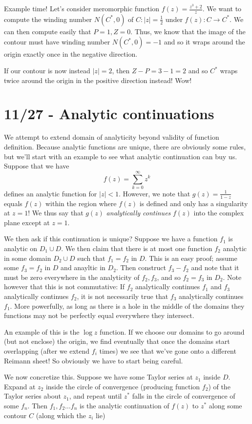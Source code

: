 \documentclass[10pt]{report}
\newcommand{\abs}[1]{\left|#1\right|}
\begin{document}
Example time! Let's consider meromorphic function $f(z) = \frac{z^3 + 2}{z}$. We want to compute the winding number $N(C^*,0)$ of $C:\abs{z} = \frac{1}{2}$ under $f(z): C \to C^*$. We can then compute easily that $P = 1, Z = 0$. Thus, we know that the image of the contour must have winding number $N(C^*,0) = -1$ and so it wraps around the origin exactly once in the negative direction. 

If our contour is now instead $\abs{z} = 2$, then $Z - P = 3-1 = 2$ and so $C^*$ wraps twice around the origin in the positive direction instead! Wow! 
\chapter{11/27 - Analytic continuations}

We attempt to extend domain of analyticity beyond validity of function definition. Because analytic functions are unique, there are obviously some rules, but we'll start with an example to see what analytic continuation can buy us. Suppose that we have
$$f(z) = \sum_{k=0}^{\infty}z^k$$
defines an analytic function for $\abs{z} < 1$. However, we note that $g(z) = \frac{1}{1-z}$ equals $f(z)$ within the region where $f(z)$ is defined and only has a singularity at $z=1$! We thus say that $g(z)$ \emph{analytically continues} $f(z)$ into the complex plane except at $z=1$. 

We then ask if this continuation is unique? Suppose we have a function $f_1$ is analytic on $D_1 \cup D$. We then claim that there is at most one function $f_2$ analytic in some domain $D_2 \cup D$ such that $f_1 = f_2$ in $D$. This is an easy proof; assume some $f_3 = f_2$ in $D$ and anayltic in $D_2$. Then construct $f_3 - f_2$ and note that it must be zero everywhere in the analyticity of $f_2, f_3$, and so $f_2 = f_3$ in $D_2$. Note however that this is not commutative: If $f_2$ analytically continues $f_1$ and $f_3$ analytically continues $f_2$, it is not necessarily true that $f_3$ analytically continues $f_1$. More powerfully, as long as there is a hole in the middle of the domains they functions may not be perfectly equal everywhere they intersect.

An example of this is the $\log z$ function. If we choose our domains to go around (but not enclose) the origin, we find eventually that once the domains start overlapping (after we extend $f_i$ times) we see that we've gone onto a different Reimann sheet! So obviously we have to start being careful.

We now concretize this. Suppose we have some Taylor series at $z_1$ inside $D$. Expand at $z_2$ inside the circle of convergence (producing function $f_2$) of the Taylor series about $z_1$, and repeat until $z^*$ falls in the circle of convergence of some $f_n$. Then $f_1, f_2\dots f_n$ is the analytic continuation of $f(z)$ to $z^*$ along some contour $C$ (along which the $z_i$ lie)
\end{document}
